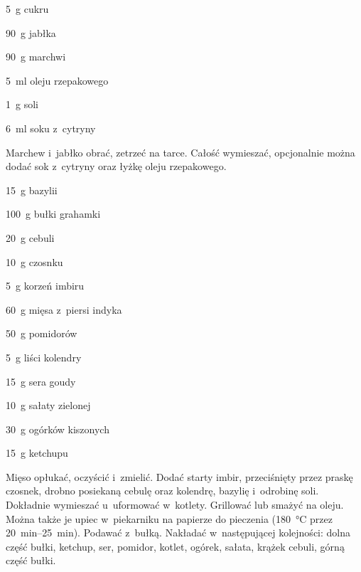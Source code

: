 \documentclass[../main.tex]{subfiles}
\begin{document}

\begin{Ingred}
    \item \qty{5}{\gram} cukru
    \item \qty{90}{\gram} jabłka
    \item \qty{90}{\gram} marchwi
    \item \qty{5}{\milli\litre} oleju rzepakowego
    \item \qty{1}{\gram} soli
    \item \qty{6}{\milli\litre} soku z~cytryny
\end{Ingred}

Marchew i~jabłko obrać, zetrzeć na tarce. Całość wymieszać, opcjonalnie można
dodać sok z~cytryny oraz łyżkę oleju rzepakowego.


\begin{Ingred}
    \item \qty{15}{\gram} bazylii
    \item \qty{100}{\gram} bułki grahamki
    \item \qty{20}{\gram} cebuli
    \item \qty{10}{\gram} czosnku
    \item \qty{5}{\gram} korzeń imbiru
    \item \qty{60}{\gram} mięsa z~piersi indyka
    \item \qty{50}{\gram} pomidorów
    \item \qty{5}{\gram} liści kolendry
    \item \qty{15}{\gram} sera goudy
    \item \qty{10}{\gram} sałaty zielonej
    \item \qty{30}{\gram} ogórków kiszonych
    \item \qty{15}{\gram} ketchupu
\end{Ingred}

Mięso opłukać, oczyścić i~zmielić. Dodać starty imbir, przeciśnięty przez
praskę czosnek, drobno posiekaną cebulę oraz kolendrę, bazylię i~odrobinę soli.
Dokładnie wymieszać u~uformować w~kotlety. Grillować lub smażyć na oleju. Można
także je upiec w~piekarniku na papierze do pieczenia (\qty{180}{\celsius} przez
\qtyrange{20}{25}{\minute}). Podawać z~bułką. Nakładać w~następującej
kolejności: dolna część bułki, ketchup, ser, pomidor, kotlet, ogórek, sałata,
krążek cebuli, górną część bułki.

\end{document}
